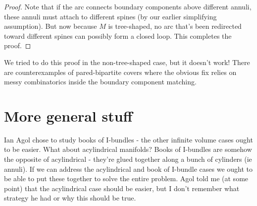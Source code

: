 \documentclass[12pt]{amsart}
\theoremstyle{definition}
\begin{document}
\begin{proof}
Note that if the arc connects boundary components above different annuli, these
annuli must attach to different spines (by our earlier simplifying assumption).
But now because $M$ is tree-shaped, no arc that's been redirected toward
different spines can possibly form a closed loop. This completes the proof.

\end{proof}

We tried to do this proof in the non-tree-shaped case, but it doesn't work!
There are counterexamples of pared-bipartite covers where the obvious fix
relies on messy combinatorics inside the boundary component matching.

\section{More general stuff}

Ian Agol chose to study books of I-bundles - the other infinite volume cases
ought to be easier. What about acylindrical manifolds? Books of I-bundles are
somehow the opposite of acylindrical - they're glued together along a bunch of
cylinders (ie annuli). If we can address the acylindrical and book of I-bundle
cases we ought to be able to put these together to solve the entire problem.
Agol told me (at some point) that the acylindrical case should be easier, but
I don't remember what strategy he had or why this should be true.




\end{document}
